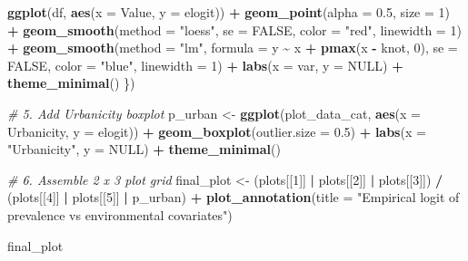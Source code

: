 \documentclass[
  letterpaper,
]{krantz}
\newenvironment{Shaded}{\begin{snugshade}}{\end{snugshade}}
\newcommand{\AttributeTok}[1]{\textcolor[rgb]{0.13,0.29,0.53}{#1}}
\newcommand{\CommentTok}[1]{\textcolor[rgb]{0.56,0.35,0.01}{\textit{#1}}}
\newcommand{\ConstantTok}[1]{\textcolor[rgb]{0.56,0.35,0.01}{#1}}
\newcommand{\DecValTok}[1]{\textcolor[rgb]{0.00,0.00,0.81}{#1}}
\newcommand{\FloatTok}[1]{\textcolor[rgb]{0.00,0.00,0.81}{#1}}
\newcommand{\FunctionTok}[1]{\textcolor[rgb]{0.13,0.29,0.53}{\textbf{#1}}}
\newcommand{\NormalTok}[1]{#1}
\newcommand{\OtherTok}[1]{\textcolor[rgb]{0.56,0.35,0.01}{#1}}
\newcommand{\SpecialCharTok}[1]{\textcolor[rgb]{0.81,0.36,0.00}{\textbf{#1}}}
\newcommand{\StringTok}[1]{\textcolor[rgb]{0.31,0.60,0.02}{#1}}
\begin{document}
\begin{Shaded}
\begin{Highlighting}[]
  \FunctionTok{ggplot}\NormalTok{(df, }\FunctionTok{aes}\NormalTok{(}\AttributeTok{x =}\NormalTok{ Value, }\AttributeTok{y =}\NormalTok{ elogit)) }\SpecialCharTok{+}
    \FunctionTok{geom\_point}\NormalTok{(}\AttributeTok{alpha =} \FloatTok{0.5}\NormalTok{, }\AttributeTok{size =} \DecValTok{1}\NormalTok{) }\SpecialCharTok{+}
    \FunctionTok{geom\_smooth}\NormalTok{(}\AttributeTok{method =} \StringTok{"loess"}\NormalTok{, }\AttributeTok{se =} \ConstantTok{FALSE}\NormalTok{, }\AttributeTok{color =} \StringTok{"red"}\NormalTok{, }\AttributeTok{linewidth =} \DecValTok{1}\NormalTok{) }\SpecialCharTok{+}
    \FunctionTok{geom\_smooth}\NormalTok{(}\AttributeTok{method =} \StringTok{"lm"}\NormalTok{,}
                \AttributeTok{formula =}\NormalTok{ y }\SpecialCharTok{\textasciitilde{}}\NormalTok{ x }\SpecialCharTok{+} \FunctionTok{pmax}\NormalTok{(x }\SpecialCharTok{{-}}\NormalTok{ knot, }\DecValTok{0}\NormalTok{),}
                \AttributeTok{se =} \ConstantTok{FALSE}\NormalTok{, }\AttributeTok{color =} \StringTok{"blue"}\NormalTok{, }\AttributeTok{linewidth =} \DecValTok{1}\NormalTok{) }\SpecialCharTok{+}
    \FunctionTok{labs}\NormalTok{(}\AttributeTok{x =}\NormalTok{ var, }\AttributeTok{y =} \ConstantTok{NULL}\NormalTok{) }\SpecialCharTok{+}
    \FunctionTok{theme\_minimal}\NormalTok{()}
\NormalTok{\})}

\CommentTok{\# 5. Add Urbanicity boxplot}
\NormalTok{p\_urban }\OtherTok{\textless{}{-}} \FunctionTok{ggplot}\NormalTok{(plot\_data\_cat, }\FunctionTok{aes}\NormalTok{(}\AttributeTok{x =}\NormalTok{ Urbanicity, }\AttributeTok{y =}\NormalTok{ elogit)) }\SpecialCharTok{+}
  \FunctionTok{geom\_boxplot}\NormalTok{(}\AttributeTok{outlier.size =} \FloatTok{0.5}\NormalTok{) }\SpecialCharTok{+}
  \FunctionTok{labs}\NormalTok{(}\AttributeTok{x =} \StringTok{"Urbanicity"}\NormalTok{, }\AttributeTok{y =} \ConstantTok{NULL}\NormalTok{) }\SpecialCharTok{+}
  \FunctionTok{theme\_minimal}\NormalTok{()}

\CommentTok{\# 6. Assemble 2 x 3 plot grid}
\NormalTok{final\_plot }\OtherTok{\textless{}{-}}\NormalTok{ (plots[[}\DecValTok{1}\NormalTok{]] }\SpecialCharTok{|}\NormalTok{ plots[[}\DecValTok{2}\NormalTok{]] }\SpecialCharTok{|}\NormalTok{ plots[[}\DecValTok{3}\NormalTok{]]) }\SpecialCharTok{/}
\NormalTok{  (plots[[}\DecValTok{4}\NormalTok{]] }\SpecialCharTok{|}\NormalTok{ plots[[}\DecValTok{5}\NormalTok{]] }\SpecialCharTok{|}\NormalTok{ p\_urban) }\SpecialCharTok{+}
  \FunctionTok{plot\_annotation}\NormalTok{(}\AttributeTok{title =} \StringTok{"Empirical logit of prevalence vs environmental covariates"}\NormalTok{)}

\NormalTok{final\_plot}
\end{Highlighting}
\end{Shaded}
\end{document}
